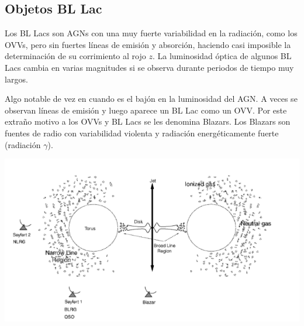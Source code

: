 	\subsection{Objetos BL Lac}
	\label{subsec:BL_Lac}

Los BL Lacs son AGNs con una muy fuerte variabilidad en la radiación, como los OVVs, pero sin fuertes líneas de emisión y absorción, haciendo casi imposible la determinación de su corrimiento al rojo $z$. La luminosidad óptica de algunos BL Lacs cambia en varias magnitudes si se observa durante periodos de tiempo muy largos.

Algo notable de vez en cuando es el bajón en la luminosidad del AGN. A veces se observan líneas de emisión y luego aparece un BL Lac como un OVV. Por este extraño motivo a los OVVs y BL Lacs se les denomina Blazars. Los Blazars son fuentes de radio con variabilidad violenta y radiación energéticamente fuerte (radiación $\gamma$).


\begin{center}
\includegraphics[scale=.55]{./figures/3_AGNs/Clasificacion_AGN}
\label{fig:Tipos_AGNs_por_observador}
\end{center}


